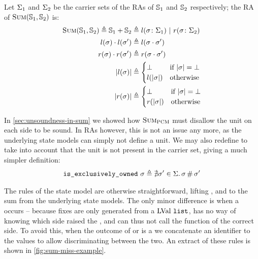 Let $\Sigma_1$ and $\Sigma_2$ be the carrier sets of the RAs of $\mathbb S_1$ and $\mathbb S_2$ respectively; the RA of $\textsc{Sum}(\mathbb S_1,\mathbb S_2)$ is:
\begin{align*}
	\textsc{Sum}(\mathbb S_1, \mathbb S_2) \triangleq \mathbb S_1+\mathbb S_2 &\triangleq l(\sigma\colon \Sigma_1) ~|~ r(\sigma\colon \Sigma_2)\\
	l(\sigma)\cdot l(\sigma') &\triangleq l(\sigma\cdot \sigma')\\
	r(\sigma)\cdot r(\sigma') &\triangleq r(\sigma\cdot \sigma')\\
	|l(\sigma)|&\triangleq \begin{cases}
 		\bot &\text{if}~ |\sigma|=\bot\\
 		l(|\sigma|) &\text{otherwise}
	 \end{cases}\\
	 |r(\sigma)|&\triangleq \begin{cases}
 		\bot &\text{if}~ |\sigma|=\bot\\
 		r(|\sigma|) &\text{otherwise}
	 \end{cases}
\end{align*}

In \cref{sec:unsoundness-in-sum} we showed how $\textsc{Sum}_{\textsc{PCM}}$ must disallow the unit on each side to be sound. In RAs however, this is not an issue any more, as the underlying state models can simply not define a unit. We may also redefine \isexowned{} to take into account that the unit is not present in the carrier set, giving a much simpler definition: \begin{align*}
	\texttt{is\_exclusively\_owned}~\sigma \triangleq \nexists \sigma'\in\Sigma\ldotp \sigma\operatorname{\#}\sigma'
\end{align*}

The rules of the \Sum{} state model are otherwise straightforward, lifting \execac, \consume{} and \produce{} to the sum from the underlying state models. The only minor difference is when a \Miss{} occurs -- because fixes are only generated from a $\text{LVal}~\texttt{list}$, \Sum{} has no way of knowing which side raised the \Miss, and can thus not call the \fix{} function of the correct side. To avoid this, when the outcome of \execac{} or \consume{} is a \Miss{} we concatenate an identifier to the values to allow discriminating between the two. An extract of these rules is shown in \autoref{fig:sum-miss-example}.

